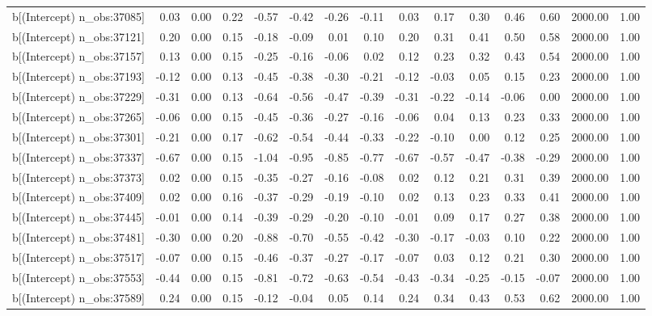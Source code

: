 \begin{table}[ht]
\begin{tabular}{rrrrrrrrrrrrrrr}
  b[(Intercept) n\_obs:37085] & 0.03 & 0.00 & 0.22 & -0.57 & -0.42 & -0.26 & -0.11 & 0.03 & 0.17 & 0.30 & 0.46 & 0.60 & 2000.00 & 1.00 \\ 
  b[(Intercept) n\_obs:37121] & 0.20 & 0.00 & 0.15 & -0.18 & -0.09 & 0.01 & 0.10 & 0.20 & 0.31 & 0.41 & 0.50 & 0.58 & 2000.00 & 1.00 \\ 
  b[(Intercept) n\_obs:37157] & 0.13 & 0.00 & 0.15 & -0.25 & -0.16 & -0.06 & 0.02 & 0.12 & 0.23 & 0.32 & 0.43 & 0.54 & 2000.00 & 1.00 \\ 
  b[(Intercept) n\_obs:37193] & -0.12 & 0.00 & 0.13 & -0.45 & -0.38 & -0.30 & -0.21 & -0.12 & -0.03 & 0.05 & 0.15 & 0.23 & 2000.00 & 1.00 \\ 
  b[(Intercept) n\_obs:37229] & -0.31 & 0.00 & 0.13 & -0.64 & -0.56 & -0.47 & -0.39 & -0.31 & -0.22 & -0.14 & -0.06 & 0.00 & 2000.00 & 1.00 \\ 
  b[(Intercept) n\_obs:37265] & -0.06 & 0.00 & 0.15 & -0.45 & -0.36 & -0.27 & -0.16 & -0.06 & 0.04 & 0.13 & 0.23 & 0.33 & 2000.00 & 1.00 \\ 
  b[(Intercept) n\_obs:37301] & -0.21 & 0.00 & 0.17 & -0.62 & -0.54 & -0.44 & -0.33 & -0.22 & -0.10 & 0.00 & 0.12 & 0.25 & 2000.00 & 1.00 \\ 
  b[(Intercept) n\_obs:37337] & -0.67 & 0.00 & 0.15 & -1.04 & -0.95 & -0.85 & -0.77 & -0.67 & -0.57 & -0.47 & -0.38 & -0.29 & 2000.00 & 1.00 \\ 
  b[(Intercept) n\_obs:37373] & 0.02 & 0.00 & 0.15 & -0.35 & -0.27 & -0.16 & -0.08 & 0.02 & 0.12 & 0.21 & 0.31 & 0.39 & 2000.00 & 1.00 \\ 
  b[(Intercept) n\_obs:37409] & 0.02 & 0.00 & 0.16 & -0.37 & -0.29 & -0.19 & -0.10 & 0.02 & 0.13 & 0.23 & 0.33 & 0.41 & 2000.00 & 1.00 \\ 
  b[(Intercept) n\_obs:37445] & -0.01 & 0.00 & 0.14 & -0.39 & -0.29 & -0.20 & -0.10 & -0.01 & 0.09 & 0.17 & 0.27 & 0.38 & 2000.00 & 1.00 \\ 
  b[(Intercept) n\_obs:37481] & -0.30 & 0.00 & 0.20 & -0.88 & -0.70 & -0.55 & -0.42 & -0.30 & -0.17 & -0.03 & 0.10 & 0.22 & 2000.00 & 1.00 \\ 
  b[(Intercept) n\_obs:37517] & -0.07 & 0.00 & 0.15 & -0.46 & -0.37 & -0.27 & -0.17 & -0.07 & 0.03 & 0.12 & 0.21 & 0.30 & 2000.00 & 1.00 \\ 
  b[(Intercept) n\_obs:37553] & -0.44 & 0.00 & 0.15 & -0.81 & -0.72 & -0.63 & -0.54 & -0.43 & -0.34 & -0.25 & -0.15 & -0.07 & 2000.00 & 1.00 \\ 
  b[(Intercept) n\_obs:37589] & 0.24 & 0.00 & 0.15 & -0.12 & -0.04 & 0.05 & 0.14 & 0.24 & 0.34 & 0.43 & 0.53 & 0.62 & 2000.00 & 1.00 \\ 

\end{tabular}
\end{table}

